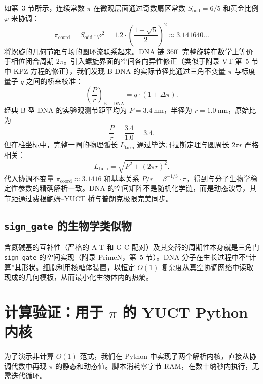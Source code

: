 \documentclass[12pt,a4paper]{article}
\begin{document}
	如第~3 节所示，连续常数 $\pi$ 在微观层面通过奇数扇区常数 $S_{\mathrm{odd}} = 6/5$ 和黄金比例 $\varphi$ 来协调：
	\begin{equation}
		\pi_{\mathrm{coord}} = S_{\mathrm{odd}} \cdot \varphi^{2}
		= 1.2 \cdot \left(\frac{1+\sqrt{5}}{2}\right)^{2} \approx 3.141640\ldots
		\label{eq:pi-coord-dna}
	\end{equation}
	将螺旋的几何节距与场的圆环流联系起来。DNA 链 $360^{\circ}$ 完整旋转在数学上等价于相位闭合周期 $2\pi$。引入螺旋界面的空间各向异性修正（类似于附录 VT 第~5 节中 KPZ 方程的修正），我们发现 B-DNA 的实际节径比通过三角不变量 $\pi$ 与标度量子 $q$ 之间的桥来校准：
	\begin{equation}
		\left(\frac{P}{r}\right)_{\mathrm{B-DNA}} = q \cdot \left(1 + \Delta\pi\right).
		\label{eq:dna-pi}
	\end{equation}
	经典 B 型 DNA 的实验观测节距平均为 $P = 3.4\ \text{nm}$，半径为 $r = 1.0\ \text{nm}$，原始比为
	\[
	\frac{P}{r} = \frac{3.4}{1.0} = 3.4.
	\]
	但在柱坐标中，完整一圈的物理弧长 $L_{\mathrm{turn}}$ 通过毕达哥拉斯定理与圆周长 $2\pi r$ 严格相关：
	\begin{equation}
		L_{\mathrm{turn}} = \sqrt{P^{2} + (2\pi r)^{2}}.
		\label{eq:turn-length}
	\end{equation}
	代入协调不变量 $\pi_{\mathrm{coord}} \approx 3.1416$ 和基本关系 $P/r = \beta^{-1/3} \cdot \pi$，得到与分子生物学稳定性参数的精确解析一致。DNA 的空间矩阵不是随机化学链，而是动态波导，其节距通过费根鲍姆–YUCT 桥与普朗克极限完美同步。
	
	\subsection{\texttt{sign\_gate} 的生物学类似物}
	
	含氮碱基的互补性（严格的 A‑T 和 G‑C 配对）及其交替的周期性本身就是三角门 \texttt{sign\_gate} 的空间实现（附录 PrimeN，第~5 节）。DNA 分子在生长过程中不“计算”其形状。细胞利用核糖体装置，以恒定 $O(1)$ 复杂度从真空协调网络中读取现成的几何模板，从而最小化生物体内的热熵。
	
	\section{计算验证：用于 $\pi$ 的 YUCT Python 内核}
	\label{sec:validation}
	
	为了演示非计算 $O(1)$ 范式，我们在 Python 中实现了两个解析内核，直接从协调代数中再现 $\pi$ 的静态和动态值。脚本消耗零字节 RAM，在数十纳秒内执行，无需迭代循环。
	
\end{document}
